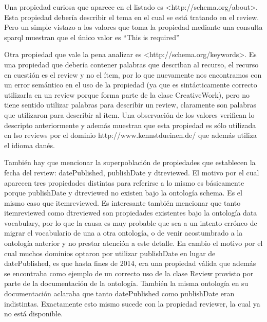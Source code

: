  Una propiedad curiosa que aparece en el listado es <http://schema.org/about>. Esta propiedad debería describir el tema en el cual 
 se está tratando en el review. Pero un simple vistazo a los valores que toma la propiedad mediante una consulta sparql muestran que 
 el único valor es ``This is required''
 
 Otra propiedad que vale la pena analizar es <http://schema.org/keywords>. Es una propiedad que debería contener palabras que describan al recurso, 
 el recurso en cuestión es el review y no el ítem, por lo que nuevamente nos encontramos con un error semántico en el uso de la propiedad (ya que es sintácticamente 
 correcto utilizarla en un review porque forma parte de la clase CreativeWork), pero no tiene sentido utilizar palabras para describir un review, claramente 
 son palabras que utilizaron para describir al ítem.
 Una observación de los valores verifican lo descripto anteriormente y además muestran que esta propiedad es sólo utilizada en lso reviews por el dominio 
 http://www.kennstdueinen.de/ que además utiliza el idioma danés.
 
 También hay que mencionar la superpoblación de propiedades que establecen la fecha del review: datePublished, publishDate y dtreviewed.
 El motivo por el cual aparecen tres propiedades distintas para referirse a lo mismo es básicamente porque publishDate y dtreviewed no existen bajo la 
 ontología schema. Es el mismo caso que itemreviewed. 
 Es interesante también mencionar que tanto itemreviewed como dtreviewed son propiedades existentes bajo la ontología data vocabulary, 
 por lo que la causa es muy probable que sea a un intento erróneo de migrar el vocabulario de una a otra ontología, o de venir acostumbrado a la 
 ontología anterior y no prestar atención a este detalle.
 En cambio el motivo por el cual muchos dominios optaron por utilizar publishDate en lugar de datePublished, es que hasta fines de 2014, 
 era una propiedad válida que además se encontraba como ejemplo de un correcto uso de la clase Review provisto por parte de la documentación 
 de la ontología. 
 También la misma ontología en su documentación aclaraba que tanto datePublished como publishDate eran indistintas.
 Exactamente esto mismo sucede con la propiedad reviewer, la cual ya no está disponible.
 
